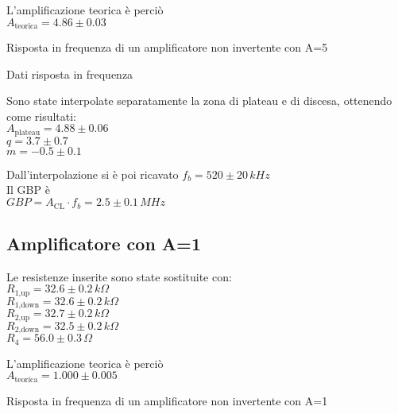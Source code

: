 L'amplificazione teorica è perciò\\
$A_\textrm{teorica} = 4.86 \pm 0.03$

\begin{grafico}
 \centering 
  \resizebox{\textwidth}{!}{%
  
  }%
 \caption{Risposta in frequenza di un amplificatore non invertente con A=5} 
 \label{gr:amp_noninv_A5.tex} 
\end{grafico}

\begin{tabella}
 \centering
   
 \caption{Dati risposta in frequenza}
 \label{tab:tab_noninv_A5.tex}
\end{tabella}

Sono state interpolate separatamente la zona di plateau e di discesa, ottenendo come risultati:\\
$A_\textrm{plateau}=4.88 \pm 0.06$\\
$q = 3.7 \pm 0.7$\\
$m = -0.5 \pm 0.1$

Dall'interpolazione si è poi ricavato 
$f_b= 520 \pm 20 \,kHz $\\
Il GBP è\\
$GBP=A_\textrm{CL} \cdot f_b = 2.5 \pm 0.1 \,MHz$


\subsection{Amplificatore con A=1}
Le resistenze inserite sono state sostituite con:\\
$R_\textrm{1,up}=32.6 \pm 0.2 \,k\Omega $\\ %
$R_\textrm{1,down}=32.6 \pm 0.2\,k\Omega$\\ %
$R_\textrm{2,up}=32.7 \pm 0.2\,k\Omega$\\ %
$R_\textrm{2,down}=32.5 \pm 0.2\,k\Omega$\\
$R_4=56.0 \pm 0.3\,\Omega$

L'amplificazione teorica è perciò\\
$A_\textrm{teorica} = 1.000 \pm 0.005$

\begin{grafico}
 \centering 
  \resizebox{\textwidth}{!}{%
  
 }%
 \caption{Risposta in frequenza di un amplificatore non invertente con A=1} 
 \label{gr:amp_noninv_A1.tex} 
\end{grafico}

